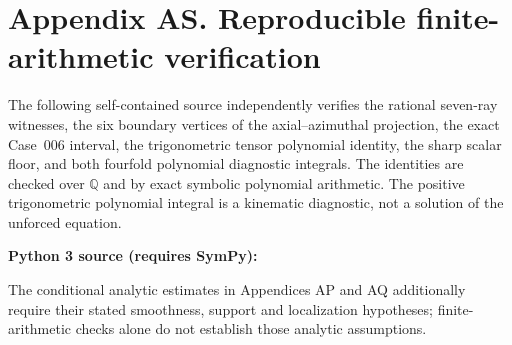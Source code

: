 \clearpage
\section*{Appendix AS. Reproducible finite-arithmetic verification}

The following self-contained source independently verifies the rational
seven-ray witnesses, the six boundary vertices of the axial--azimuthal
projection, the exact Case~006 interval, the trigonometric tensor
polynomial identity, the sharp scalar floor, and both fourfold polynomial
diagnostic integrals. The identities are checked over
\(\mathbb{Q}\) and by exact symbolic polynomial arithmetic. The positive
trigonometric polynomial integral is a kinematic diagnostic, not a
solution of the unforced equation.

\medskip
\noindent\textbf{Python 3 source (requires SymPy):}

The conditional analytic estimates in Appendices AP and AQ additionally
require their stated smoothness, support and localization hypotheses;
finite-arithmetic checks alone do not establish those analytic assumptions.
